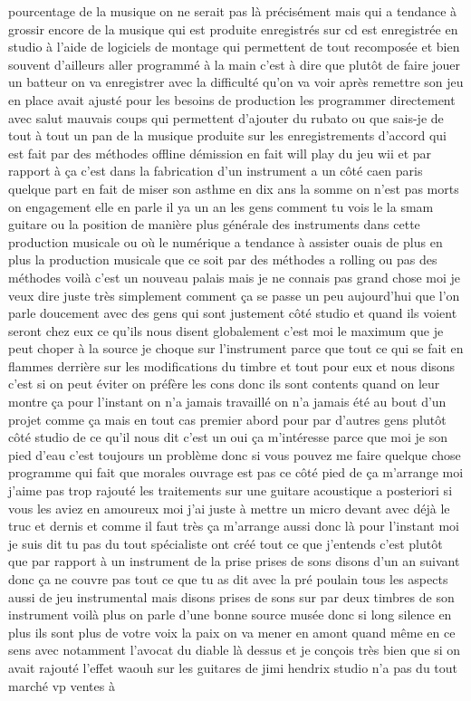  pourcentage de la musique on ne serait pas là précisément mais qui a tendance à grossir encore de la musique qui est produite enregistrés sur cd est enregistrée en studio à l'aide de logiciels de montage qui permettent de tout recomposée et bien souvent d'ailleurs aller programmé à la main c'est à dire que plutôt de faire jouer un batteur on va enregistrer avec la difficulté qu'on va voir après remettre son jeu en place avait ajusté pour les besoins de production les programmer directement avec salut mauvais coups qui permettent d'ajouter du rubato ou que sais-je de tout à tout un pan de la musique produite sur les enregistrements d'accord qui est fait par des méthodes offline démission en fait will play du jeu wii et par rapport à ça c'est dans la fabrication d'un instrument a un côté caen paris quelque part en fait de miser son asthme en dix ans la somme on n'est pas morts on engagement elle en parle il ya un an les gens comment tu vois le la smam guitare ou la position de manière plus générale des instruments dans cette production musicale ou où le numérique a tendance à assister ouais de plus en plus la production musicale que ce soit par des méthodes a rolling ou pas des méthodes voilà c'est un nouveau palais mais je ne connais pas grand chose moi je veux dire juste très simplement comment ça se passe un peu aujourd'hui que l'on parle doucement avec des gens qui sont justement côté studio et quand ils voient seront chez eux ce qu'ils nous disent globalement c'est moi le maximum que je peut choper à la source je choque sur l'instrument parce que tout ce qui se fait en flammes derrière sur les modifications du timbre et tout pour eux et nous disons c'est si on peut éviter on préfère les cons donc ils sont contents quand on leur montre ça pour l'instant on n'a jamais travaillé on n'a jamais été au bout d'un projet comme ça mais en tout cas premier abord pour par d'autres gens plutôt côté studio de ce qu'il nous dit c'est un oui ça m'intéresse parce que moi je son pied d'eau c'est toujours un problème donc si vous pouvez me faire quelque chose programme qui fait que morales ouvrage est pas ce côté pied de ça m'arrange moi j'aime pas trop rajouté les traitements sur une guitare acoustique a posteriori si vous les aviez en amoureux moi j'ai juste à mettre un micro devant avec déjà le truc et dernis et comme il faut très ça m'arrange aussi donc là pour l'instant moi je suis dit tu pas du tout spécialiste ont créé tout ce que j'entends c'est plutôt que par rapport à un instrument de la prise prises de sons disons d'un an suivant donc ça ne couvre pas tout ce que tu as dit avec la pré poulain tous les aspects aussi de jeu instrumental mais disons prises de sons sur par deux timbres de son instrument voilà plus on parle d'une bonne source musée donc si long silence en plus ils sont plus de votre voix la paix on va mener en amont quand même en ce sens avec notamment l'avocat du diable là dessus et je conçois très bien que si on avait rajouté l'effet waouh sur les guitares de jimi hendrix studio n'a pas du tout marché vp ventes à 
